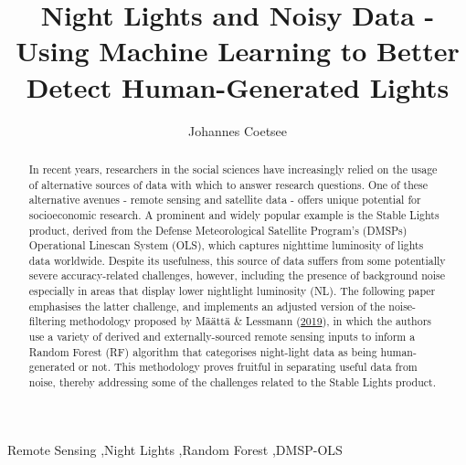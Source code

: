 \documentclass[11pt,preprint, authoryear]{elsarticle}
\numberwithin{equation}{section}
\numberwithin{figure}{section}
\numberwithin{table}{section}
\begin{document}
\begin{frontmatter}  %

\title{Night Lights and Noisy Data - Using Machine Learning to Better
Detect Human-Generated Lights}





\author[Add1]{Johannes Coetsee}





\address[Add1]{Stellenbosch University}


\begin{abstract}
\small{
In recent years, researchers in the social sciences have increasingly
relied on the usage of alternative sources of data with which to answer
research questions. One of these alternative avenues - remote sensing
and satellite data - offers unique potential for socioeconomic research.
A prominent and widely popular example is the Stable Lights product,
derived from the Defense Meteorological Satellite Program's (DMSPs)
Operational Linescan System (OLS), which captures nighttime luminosity
of lights data worldwide. Despite its usefulness, this source of data
suffers from some potentially severe accuracy-related challenges,
however, including the presence of background noise especially in areas
that display lower nightlight luminosity (NL). The following paper
emphasises the latter challenge, and implements an adjusted version of
the noise-filtering methodology proposed by Määttä \& Lessmann
(\protect\hyperlink{ref-maatta}{2019}), in which the authors use a
variety of derived and externally-sourced remote sensing inputs to
inform a Random Forest (RF) algorithm that categorises night-light data
as being human-generated or not. This methodology proves fruitful in
separating useful data from noise, thereby addressing some of the
challenges related to the Stable Lights product.
}
\end{abstract}

\vspace{1cm}

\begin{keyword}
\footnotesize{
Remote Sensing \sep Night Lights \sep Random Forest
\sep DMSP-OLS \\ \vspace{0.3cm}
}
\end{keyword}
\vspace{0.5cm}
\end{frontmatter}
\end{document}
